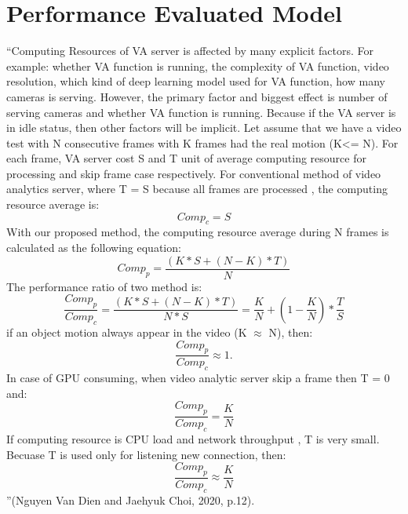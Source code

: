 \section{ Performance Evaluated Model}
“Computing Resources of VA server is affected by many explicit factors. For example:  whether VA function is running, the complexity of VA function, video resolution, which kind of deep learning model used for VA function, how many cameras is serving. However, the primary factor and biggest effect is number of serving cameras and whether VA function is running. Because if  the VA server is in idle status, then other factors will be implicit. Let assume that we have a video test with N consecutive frames with K frames had the real motion (K<= N).  For each frame, VA server cost S and T unit  of average computing resource  for processing and skip frame case respectively.
For conventional method  of video analytics server, where T = S because all frames are processed , the computing resource average is:\\
\begin{equation}
\label{eqn:3}
Comp_{c}=S
\end{equation}
With our proposed method, the computing resource average during N frames  is calculated as the following equation:\\
\begin{equation}
\label{eqn:4}
Comp_{p}=\frac{(K*S+(N-K)*T)}{N}
\end{equation}
The performance ratio of two method is: \\
\begin{equation}
\label{eqn:5}
\frac{Comp_{p}}{Comp_{c}}=\frac{(K*S+(N-K)*T)}{N*S}=\frac{K}{N} + (1 - \frac{K}{N})*\frac{T}{S}
\end{equation}
if an object motion always appear in the video (K $\approx$ N), then: \\
\begin{equation}
\label{eqn:6}
 \frac{Comp_{p}}{Comp_{c}}\approx 1.
\end{equation}
In case of GPU consuming, when video analytic server skip a frame then T = 0 and:\\
\begin{equation}
\label{eqn:7}
\frac{Comp_{p}}{Comp_{c}} = \frac{K}{N}
\end{equation}
 If computing resource is CPU load and  network throughput ,  T is very small. Becuase T is used only for listening new connection, then: \\
\begin{equation}
\label{eqn:8}
 \frac{Comp_{p}}{Comp_{c}} \approx \frac{K}{N}
\end{equation}
”(Nguyen Van Dien and Jaehyuk Choi, 2020, p.12).
